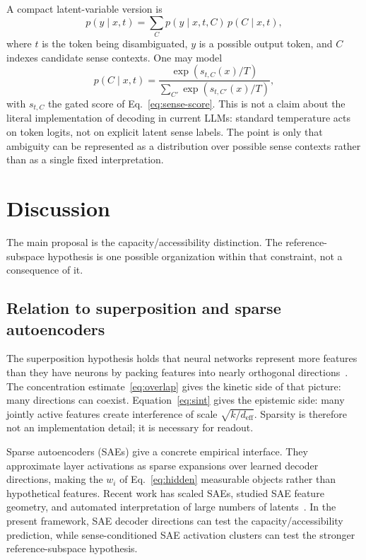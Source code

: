 \documentclass[
  aps,
  reprint,
  superscriptaddress,
  floatfix,
  nofootinbib,
  longbibliography
]{revtex4-2}
\newcommand{\deff}{d_{\mathrm{eff}}}
\begin{document}
A compact latent-variable version is
%
\begin{equation}
\label{eq:latent}
p(y\mid x,t)=\sum_C p(y\mid x,t,C)\,p(C\mid x,t),
\end{equation}
%
where $t$ is the token being disambiguated, $y$ is a possible output token,
and $C$ indexes candidate sense contexts. One may model
%
\begin{equation}
\label{eq:context-temp}
p(C\mid x,t)=
\frac{\exp(s_{t,C}(x)/T)}
{\sum_{C'}\exp(s_{t,C'}(x)/T)} ,
\end{equation}
%
with $s_{t,C}$ the gated score of Eq.~\eqref{eq:sense-score}. This is not
a claim about the literal implementation of decoding in current LLMs:
standard temperature acts on token logits, not on explicit latent
sense labels. The point is only that ambiguity can be represented as a
distribution over possible sense contexts rather than as a single fixed
interpretation.

\section{Discussion}
\label{sec:discussion}

The main proposal is the capacity/accessibility distinction. The
reference-subspace hypothesis is one possible organization within that
constraint, not a consequence of it.

\subsection{Relation to superposition and sparse autoencoders}
\label{sec:superposition}

The superposition hypothesis holds that neural networks represent more
features than they have neurons by packing features into nearly
orthogonal directions~\cite{elhage2022superposition,bricken2023monosemanticity}. The concentration
estimate~\eqref{eq:overlap} gives the kinetic side of that picture:
many directions can coexist. Equation~\eqref{eq:sint} gives the
epistemic side: many jointly active features create interference of
scale $\sqrt{k/\deff}$. Sparsity is therefore not an implementation
detail; it is necessary for readout.

Sparse autoencoders (SAEs) give a concrete empirical interface. They
approximate layer activations as sparse expansions over learned decoder
directions, making the $w_i$ of Eq.~\eqref{eq:hidden} measurable
objects rather than hypothetical features. Recent work has scaled SAEs,
studied SAE feature geometry, and automated interpretation of large
numbers of latents~\cite{gao2025scaling,li2025geometry,paulo2025automatically,shu2025survey}. In the
present framework, SAE decoder directions can test the
capacity/accessibility prediction, while sense-conditioned SAE
activation clusters can test the stronger reference-subspace hypothesis.
\end{document}
